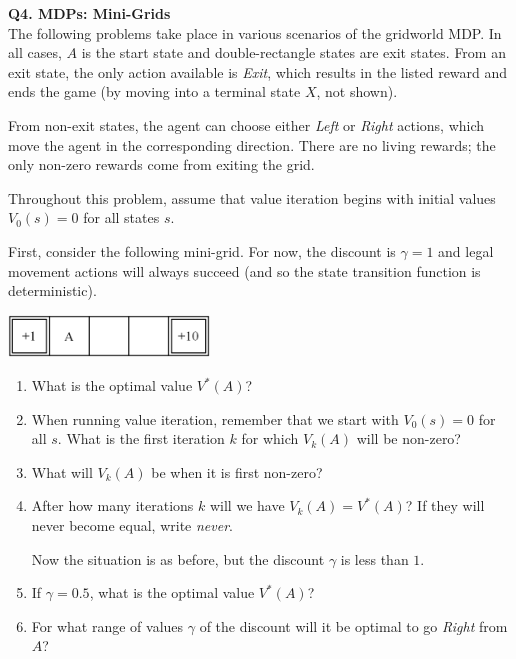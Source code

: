 \textbf{Q4. MDPs: Mini-Grids}  \\

The following problems take place in various scenarios of the gridworld MDP.
In all cases, $A$ is the start state and double-rectangle states are exit states.
From an exit state, the only action available is \emph{Exit}, which results in the listed reward and ends the game (by moving into a terminal state $X$, not shown).

From non-exit states, the agent can choose either \emph{Left} or \emph{Right} actions, which move the agent in the corresponding direction.
There are no living rewards; the only non-zero rewards come from exiting the grid.

Throughout this problem, assume that value iteration begins with initial values $V_0(s) = 0$ for all states $s$.

First, consider the following mini-grid.
For now, the discount is $\gamma = 1$ and legal movement actions will always succeed (and so the state transition function is deterministic).

\begin{center}
\centering
\includegraphics[width=0.4\textwidth]{figures/minigrid-discount.png}
\end{center}

\begin{enumerate}
\item What is the optimal value $V^*(A)$? 
\vfill
\item When running value iteration, remember that we start with $V_0(s)=0$ for all $s$.
What is the first iteration $k$ for which $V_k(A)$ will be non-zero?
\vfill

\item What will $V_k(A)$ be when it is first non-zero?
\vfill

\item After how many iterations $k$ will we have $V_k(A) = V^*(A)$?  If they will never become equal, write \emph{never}.
\vfill

\newpage
Now the situation is as before, but the discount $\gamma$ is less than $1$.
\item If $\gamma = 0.5$, what is the optimal value $V^*(A)$?
\vfill

\item For what range of values $\gamma$ of the discount will it be optimal to go \emph{Right} from $A$?
\vfill

\end{enumerate}
